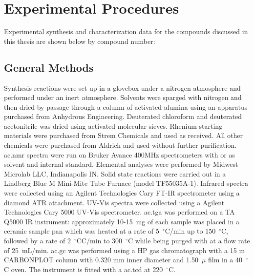 \chapter{Experimental Procedures}\label{chap.exp}

Experimental synthesis and characterization data for the compounds discussed in this thesis are shown below by compound number:

\section{General Methods}\label{sec:.genmethods}
Synthesis reactions were set-up in a glovebox under a nitrogen atmosphere and performed under an inert atmosphere. Solvents were sparged with nitrogen and then dried by passage through a column of activated alumina using an apparatus purchased from Anhydrous Engineering. Deuterated chloroform and deuterated acetonitrile was dried using activated molecular sieves. Rhenium starting materials were purchased from Strem Chemicals and used as received. All other chemicals were purchased from Aldrich and used without further purification. \Gls{ac.nmr} spectra were run on Bruker Avance 400MHz spectrometers with  or  as solvent and internal standard. Elemental analyses were performed by Midwest Microlab LLC, Indianapolis IN. Solid state reactions were carried out in a Lindberg Blue M Mini-Mite Tube Furnace (model TF55035A-1). Infrared spectra were collected using an Agilent Technologies Cary FT-IR spectrometer using a diamond ATR attachment. UV-Vis spectra were collected using a Agilent Technologies Cary 5000 UV-Vis spectrometer. \Gls{ac.tga} was performed on a TA Q5000 IR instrument: approximately 10-15~mg of each sample was placed in a ceramic sample pan which was heated at a rate of 5~$^\circ$C/min up to 150~$^\circ$C, followed by a rate of 2~$^\circ$CC/min to 300~$^\circ$C while being purged with  at a flow rate of 25~mL/min. \Gls{ac.gc} was performed using a HP gas chromatograph with a 15 m CARBONPLOT column with 0.320 mm inner diameter and 1.50~$\mu$ film in a 40~$^\circ$C oven. The instrument is fitted with a \gls{ac.tcd} at 220~$^\circ$C.

